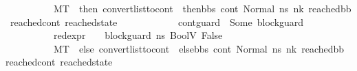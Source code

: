 \begin{isabellebody}
\ \ \ \ \ \ \ \ \ \ M{\isacharcomma}{\kern0pt}{\isasymLambda}{\isacharcomma}{\kern0pt}{\isasymGamma}{\isacharcomma}{\kern0pt}{\isasymOmega}{\isacharcomma}{\kern0pt}T\ {\isasymturnstile}\ {\isacharparenleft}{\kern0pt}then{}{\isacharcomma}{\kern0pt}\ convert{\isacharunderscore}{\kern0pt}list{\isacharunderscore}{\kern0pt}to{\isacharunderscore}{\kern0pt}cont\ {\isacharparenleft}{\kern0pt}\ then{\isacharunderscore}{\kern0pt}bbs{\isacharparenright}{\kern0pt}\ cont{}{\isacharcomma}{\kern0pt}\ {\isacharparenleft}{\kern0pt}Normal\ ns{}{\isacharprime}{\kern0pt}{\isacharprime}{\kern0pt}{\isacharparenright}{\kern0pt}{\isacharparenright}{\kern0pt}\ {\isacharminus}{\kern0pt}n{\isasymlongrightarrow}{\isacharcircum}{\kern0pt}k\ {\isacharparenleft}{\kern0pt}reached{\isacharunderscore}{\kern0pt}bb{\isacharcomma}{\kern0pt}\ reached{\isacharunderscore}{\kern0pt}cont{\isacharcomma}{\kern0pt}\ reached{\isacharunderscore}{\kern0pt}state{\isacharparenright}{\kern0pt}\ {\isacharparenright}{\kern0pt}\ {\isasymor}\ \isanewline
\ \ \ \ \ \ \ \ {\isacharparenleft}{\kern0pt}\ {\isacharparenleft}{\kern0pt}cont{\isacharunderscore}{\kern0pt}guard\ {\isacharequal}{\kern0pt}\ Some\ block{\isacharunderscore}{\kern0pt}guard{\isacharparenright}{\kern0pt}\ {\isasymand}\ \isanewline
\ \ \ \ \ \ \ \ \ \ {\isacharparenleft}{\kern0pt}red{\isacharunderscore}{\kern0pt}expr\ {\isasymLambda}\ {\isasymGamma}\ {\isasymOmega}\ block{\isacharunderscore}{\kern0pt}guard\ ns{}{\isacharprime}{\kern0pt}{\isacharprime}{\kern0pt}\ {\isacharparenleft}{\kern0pt}BoolV\ False{\isacharparenright}{\kern0pt}{\isacharparenright}{\kern0pt}\ {\isasymand}\isanewline
\ \ \ \ \ \ \ \ \ \ M{\isacharcomma}{\kern0pt}{\isasymLambda}{\isacharcomma}{\kern0pt}{\isasymGamma}{\isacharcomma}{\kern0pt}{\isasymOmega}{\isacharcomma}{\kern0pt}T\ {\isasymturnstile}\ {\isacharparenleft}{\kern0pt}else{}{\isacharcomma}{\kern0pt}\ convert{\isacharunderscore}{\kern0pt}list{\isacharunderscore}{\kern0pt}to{\isacharunderscore}{\kern0pt}cont\ {\isacharparenleft}{\kern0pt}\ else{\isacharunderscore}{\kern0pt}bbs{\isacharparenright}{\kern0pt}\ cont{}{\isacharcomma}{\kern0pt}\ {\isacharparenleft}{\kern0pt}Normal\ ns{}{\isacharprime}{\kern0pt}{\isacharprime}{\kern0pt}{\isacharparenright}{\kern0pt}{\isacharparenright}{\kern0pt}\ {\isacharminus}{\kern0pt}n{\isasymlongrightarrow}{\isacharcircum}{\kern0pt}k\ {\isacharparenleft}{\kern0pt}reached{\isacharunderscore}{\kern0pt}bb{\isacharcomma}{\kern0pt}\ reached{\isacharunderscore}{\kern0pt}cont{\isacharcomma}{\kern0pt}\ reached{\isacharunderscore}{\kern0pt}state{\isacharparenright}{\kern0pt}\ {\isacharparenright}{\kern0pt}\ {\isasymor}\isanewline

\end{isabellebody}
